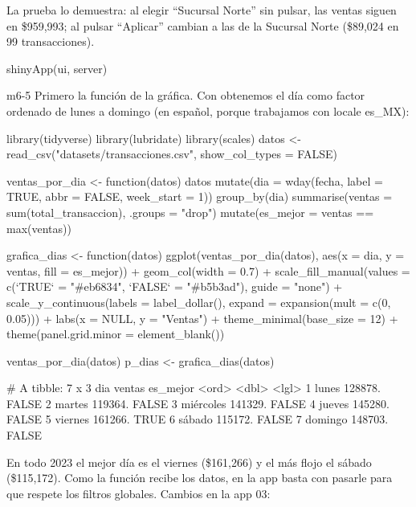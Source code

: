 La prueba lo demuestra: al elegir ``Sucursal Norte'' sin pulsar, las ventas
siguen en \$959,993; al pulsar ``Aplicar'' cambian a las de la Sucursal
Norte (\$89,024 en 99 transacciones).

\begin{rnoejecutar}
shinyApp(ui, server)
\end{rnoejecutar}

\begin{solucion}{m6-5}
Primero la función de la gráfica. Con  obtenemos el día como factor ordenado de lunes a domingo
(en español, porque trabajamos con locale es\_MX):
\end{solucion}

\begin{rcode}
library(tidyverse)
library(lubridate)
library(scales)
datos <- read_csv("datasets/transacciones.csv", show_col_types = FALSE)

ventas_por_dia <- function(datos) {
  datos %
    mutate(dia = wday(fecha, label = TRUE, abbr = FALSE,
                      week_start = 1)) %
    group_by(dia) %
    summarise(ventas = sum(total_transaccion), .groups = "drop") %
    mutate(es_mejor = ventas == max(ventas))
}

grafica_dias <- function(datos) {
  ggplot(ventas_por_dia(datos), aes(x = dia, y = ventas, fill = es_mejor)) +
    geom_col(width = 0.7) +
    scale_fill_manual(values = c(`TRUE` = "#eb6834", `FALSE` = "#b5b3ad"),
                      guide = "none") +
    scale_y_continuous(labels = label_dollar(),
                       expand = expansion(mult = c(0, 0.05))) +
    labs(x = NULL, y = "Ventas") +
    theme_minimal(base_size = 12) +
    theme(panel.grid.minor = element_blank())
}

ventas_por_dia(datos)
p_dias <- grafica_dias(datos)
\end{rcode}
\begin{rsalida}
# A tibble: 7 x 3
  dia        ventas es_mejor
  <ord>       <dbl> <lgl>   
1 lunes     128878. FALSE   
2 martes    119364. FALSE   
3 miércoles 141329. FALSE   
4 jueves    145280. FALSE   
5 viernes   161266. TRUE    
6 sábado    115172. FALSE   
7 domingo   148703. FALSE   
\end{rsalida}

En todo 2023 el mejor día es el viernes (\$161,266) y el más flojo el
sábado (\$115,172). Como la función recibe los datos, en la app basta con pasarle
 para que respete los filtros globales. Cambios en
la app 03:

